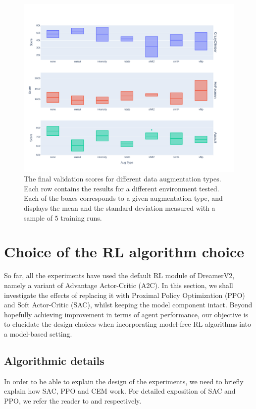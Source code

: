 \documentclass[en]{pracamgr}
\newcommand{\figurewidth}{\linewidth}
\newcommand{\figureheight}{0.8\paperheight}
\begin{document}
\begin{figure}
  \centering
  \includegraphics[width=\figurewidth,height=\figureheight,keepaspectratio]{assets/data_aug.sweep.pdf}
  \caption{The final validation scores for different data augmentation types. Each row contains the results for a different environment tested. Each of the boxes corresponds to a given augmentation type, and displays the mean and the standard deviation measured with a sample of $5$ training runs.}
  \label{fig:data_aug_sweep}
\end{figure}

\section{Choice of the RL algorithm choice}

So far, all the experiments have used the default RL module of DreamerV2, namely a variant of Advantage Actor-Critic (A2C). In this section, we shall investigate the effects of replacing it with Proximal Policy Optimization (PPO) and Soft Actor-Critic (SAC), whilst keeping the model component intact. Beyond hopefully achieving improvement in terms of agent performance, our objective is to elucidate the design choices when incorporating model-free RL algorithms into a model-based setting.

\subsection{Algorithmic details}

In order to be able to explain the design of the experiments, we need to briefly explain how SAC, PPO and CEM work. For detailed exposition of SAC and PPO, we refer the reader to \autocite{haarnojaSoftActorCriticOffPolicy2018} and \autocite{schulmanProximalPolicyOptimization2017} respectively.
\end{document}
